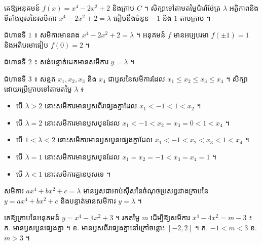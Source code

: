 \begin{example}[លំហាត់គំរូ]
គេឱ្យអនុគមន៍ $f(x) = x^4 - 2x^2 + 2$ និងក្រាប $C$ ។ សិក្សាទៅតាមតម្លៃប៉ារ៉ាម៉ែត្រ $\lambda$ អត្ថិភាពនិងទីតាំងឫសនៃសមីការ $x^4 - 2x^2 + 2 = \lambda$ ធៀបនឹងចំនួន $-1$ និង $1$ តាមក្រាប ។
\end{example}
\ans
ជំហានទី $1$ ៖ សមីការមានរាង $x^4 - 2x^2 + 2 = \lambda$ ។ អនុគមន៍ $f$ មានអប្បបរមា $f(\pm 1) = 1$ និងអតិបរមាធៀប $f(0) = 2$ ។

ជំហានទី $2$ ៖ សង់បន្ទាត់ដេកមានសមីការ $y = \lambda$ ។

\begin{center}
\end{center}

ជំហានទី $3$ ៖ សន្មត $x_1, x_2, x_3$ និង $x_4$ ជាឫសនៃសមីការដែល $x_1 \le x_2 \le x_3 \le x_4$ ។ សិក្សាដោយប្រើក្រាបទៅតាមតម្លៃ $\lambda$ ៖
\begin{itemize}
  \item បើ $\lambda > 2$ នោះសមីការមានឫសពីរផ្សេងគ្នាដែល $x_1 < -1 < 1 < x_2$ ។
  \item បើ $\lambda = 2$ នោះសមីការមានឫសបួនដែល $x_1 < -1 < x_2 = x_3 = 0 < 1 < x_4$ ។
  \item បើ $1 < \lambda < 2$ នោះសមីការមានឫសបួនផ្សេងគ្នាដែល $x_1 < -1 < x_2 < x_3 < 1 < x_4$ ។
  \item បើ $\lambda = 1$ នោះសមីការមានឫសបួនដែល $x_1 = x_2 = -1 < x_3 = x_4 = 1$ ។
  \item បើ $\lambda < 1$ នោះសមីការគ្មានឫសទេ ។
\end{itemize}

\begin{formulaBox}[ជាទូទៅ]
សមីការ $ax^4 + bx^2 + c = \lambda$ មានឫសជាអាប់ស៊ីសនៃចំណុចប្រសព្វរវាងក្រាបនៃ $y = ax^4 + bx^2 + c$ និងបន្ទាត់មានសមីការ $y = \lambda$ ។
\end{formulaBox}

\begin{pro}
គេឱ្យក្រាបនៃអនុគមន៍ $y = x^4 - 4x^2 + 3$ ។ រកតម្លៃ $m$ ដើម្បីឱ្យសមីការ $x^4 - 4x^2 = m - 3$ ៖ \quad ក. មានឫសបួនផ្សេងគ្នា ។ \quad ខ. មានឫសពីរផ្សេងគ្នានៅក្រៅចន្លោះ $[-2, 2]$ ។
\ans
ក. $-1 < m < 3$ \quad ខ. $m > 3$ ។
\end{pro}

